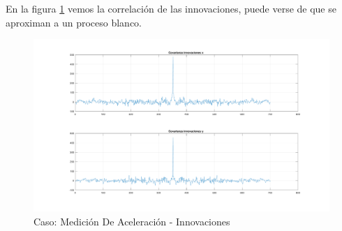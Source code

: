 		En la figura \ref{fig:ej2c_innov} vemos la correlación de las innovaciones, puede verse de que se aproximan a un proceso blanco.
		
		\begin{figure}[H]
			\centering
			\includegraphics[width=1.0\textwidth,keepaspectratio]{Figuras/covinn_ej2c.pdf}
			\caption{Caso: Medición De Aceleración - Innovaciones}
			\label{fig:ej2c_innov}
		\end{figure}



